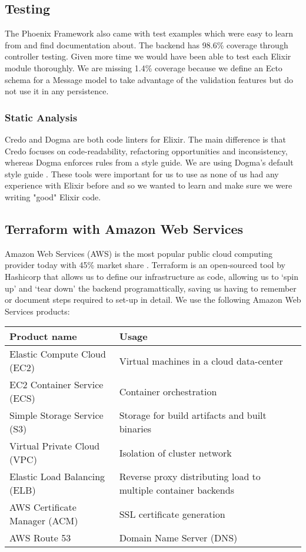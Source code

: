 \documentclass[11pt,a4paper]{report}
\begin{document}
\subsection{Testing}

The Phoenix Framework also came with test examples which were easy to learn from and find documentation about. The backend has 98.6\% coverage through controller testing. Given more time we would have been able to test each Elixir module thoroughly. We are missing 1.4\% coverage because we define an Ecto schema for a Message model to take advantage of the validation features but do not use it in any persistence.

\subsubsection{Static Analysis}

Credo and Dogma are both code linters for Elixir. The main difference is that Credo focuses on code-readability, refactoring opportunities and inconsistency, whereas Dogma enforces rules from a style guide. We are using Dogma's default style guide \cite{website:elixir_dogma_rules}. These tools were important for us to use as none of us had any experience with Elixir before and so we wanted to learn and make sure we were writing "good" Elixir code.

\subsection{Terraform with Amazon Web Services}

Amazon Web Services (AWS) is the most popular public cloud computing provider today with 45\% market share \cite{website:geekwire_cloud_share}. Terraform is an open-sourced tool by Hashicorp that allows us to define our infrastructure as code, allowing us to `spin up' and `tear down' the backend programattically, saving us having to remember or document steps required to set-up in detail. We use the following Amazon Web Services products:

\begin{tabular}{| l | p{6cm} |}
  \hline
  Product name & Usage \\
  \hline
  Elastic Compute Cloud (EC2) & Virtual machines in a cloud data-center\\
  EC2 Container Service (ECS) & Container orchestration \\
  Simple Storage Service (S3) & Storage for build artifacts and built binaries \\
  Virtual Private Cloud (VPC) & Isolation of cluster network\\
  Elastic Load Balancing (ELB) & Reverse proxy distributing load to multiple container backends\\
  AWS Certificate Manager (ACM) & SSL certificate generation\\
  AWS Route 53 & Domain Name Server (DNS)\\
  \hline
\end{tabular}
\end{document}
